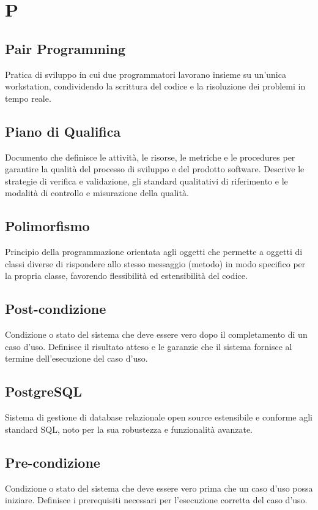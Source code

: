 \documentclass[a4paper,11pt]{article}
\begin{document}
\newpage
\section{P}

\subsection{Pair Programming}
Pratica di sviluppo in cui due programmatori lavorano insieme su un'unica workstation, condividendo la scrittura del codice e la risoluzione dei problemi in tempo reale.

\subsection{Piano di Qualifica}
Documento che definisce le attività, le risorse, le metriche e le procedures per garantire la qualità del processo di sviluppo e del prodotto software. Descrive le strategie di verifica e validazione, gli standard qualitativi di riferimento e le modalità di controllo e misurazione della qualità.

\subsection{Polimorfismo}
Principio della programmazione orientata agli oggetti che permette a oggetti di classi diverse di rispondere allo stesso messaggio (metodo) in modo specifico per la propria classe, favorendo flessibilità ed estensibilità del codice.

\subsection{Post-condizione}
Condizione o stato del sistema che deve essere vero dopo il completamento di un caso d'uso. Definisce il risultato atteso e le garanzie che il sistema fornisce al termine dell'esecuzione del caso d'uso.

\subsection{PostgreSQL}
Sistema di gestione di database relazionale open source estensibile e conforme agli standard SQL, noto per la sua robustezza e funzionalità avanzate.

\subsection{Pre-condizione}
Condizione o stato del sistema che deve essere vero prima che un caso d'uso possa iniziare. Definisce i prerequisiti necessari per l'esecuzione corretta del caso d'uso.
\end{document}
